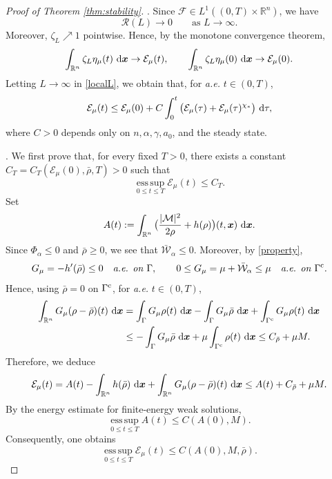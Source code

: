 \documentclass[reqno,11pt]{amsart}
\numberwithin{equation}{section}
\theoremstyle{definition}
\def\dd{{\, \rm d}}
\begin{document}
\begin{proof}[Proof of {\rm Theorem \ref{thm:stability}}]
. 
Since $ \mathcal{F}\in L^1((0,T)\times\mathbb R^n)$, we have
\[
 \mathcal R(L)\to0
 \qquad\text{as }L\to\infty .
\]
Moreover, $\zeta_L\nearrow1$ pointwise.  Hence, by the monotone convergence
theorem,
\[
\int_{\mathbb R^n}\zeta_L\eta_\mu(t)\,\dd\boldsymbol{x}\to\mathcal E_\mu(t),
  \qquad
\int_{\mathbb R^n}\zeta_L\eta_\mu(0)\,\dd\boldsymbol{x}\to\mathcal E_\mu(0).
\]
Letting $L\to\infty$ in \eqref{localL}, we obtain that, for {\it a.e.} $t\in(0,T)$,
\begin{equation}\label{ODEestimate} \mathcal E_\mu(t)\le
 \mathcal E_\mu(0)
+C\int_0^t\big(\mathcal E_\mu(\tau)+\mathcal E_\mu(\tau)^{\chi_*}\big)\,\dd\tau,
\end{equation}
where $C>0$ depends only on $n,\alpha,\gamma,a_0$, and the steady state.

. We first prove that, for every fixed $T>0$, there exists a constant
$C_T=C_T(\mathcal E_\mu(0),\bar{\rho},T)>0$ such that
\begin{equation}\label{apriorrb}
 \operatorname*{ess\,sup}_{0\le t\le T}\mathcal E_\mu(t)\le C_T .
\end{equation}
Set
\[
 A(t):=\int_{\mathbb R^n}
 \big(\frac{|\mathcal M|^2}{2\rho}+h(\rho)\big)(t,\boldsymbol{x})\,
 \dd\boldsymbol{x}.
\]
Since $\Phi_\alpha\le0$ and $\bar\rho\ge0$, we see that
$\bar{\mathcal W}_\alpha\le0$.  Moreover, by \eqref{property},
\[
 G_\mu=-h'(\bar\rho)\le0
 \quad\hbox{\it a.e. on }\Gamma,
 \qquad
 0\le G_\mu=\mu+\bar{\mathcal W}_\alpha\le\mu
 \quad\hbox{\it a.e. on }\Gamma^{\rm c} .
\]
Hence, using $\bar\rho=0$ on $\Gamma^{\rm c}$, for {\it a.e.} $t\in(0,T)$,
\[
\begin{aligned}
 \int_{\mathbb R^n}G_\mu(\rho-\bar\rho)(t)\,\dd\boldsymbol{x}
 &=
 \int_{\Gamma}G_\mu\rho(t)\,\dd\boldsymbol{x}
 -\int_{\Gamma}G_\mu\bar\rho\,\dd\boldsymbol{x}
 +\int_{\Gamma^{\rm c}}G_\mu\rho(t)\,\dd\boldsymbol{x}  \\
 &\le
 -\int_{\Gamma}G_\mu\bar\rho\,\dd\boldsymbol{x}
 +\mu\int_{\Gamma^{\rm c}}\rho(t)\,\dd\boldsymbol{x}\le
 C_{\bar\rho}+\mu M .
\end{aligned}
\]
Therefore, we deduce
\[
\begin{aligned}
 \mathcal E_\mu(t)
 = A(t)-\int_{\mathbb R^n}h(\bar\rho)\,\dd\boldsymbol{x}
 +\int_{\mathbb R^n}G_\mu(\rho-\bar\rho)(t)\,\dd\boldsymbol{x}\le A(t)+C_{\bar\rho}+\mu M .
\end{aligned}
\]
By the energy estimate for finite-energy weak solutions,
\[
 \operatorname*{ess\,sup}_{0\le t\le T} A(t)
 \le C(A(0),M).
\]
Consequently, one obtains
\[
 \operatorname*{ess\,sup}_{0\le t\le T}\mathcal E_\mu(t)
 \le C(A(0),M,\bar\rho).
\]


\end{proof}
\end{document}
